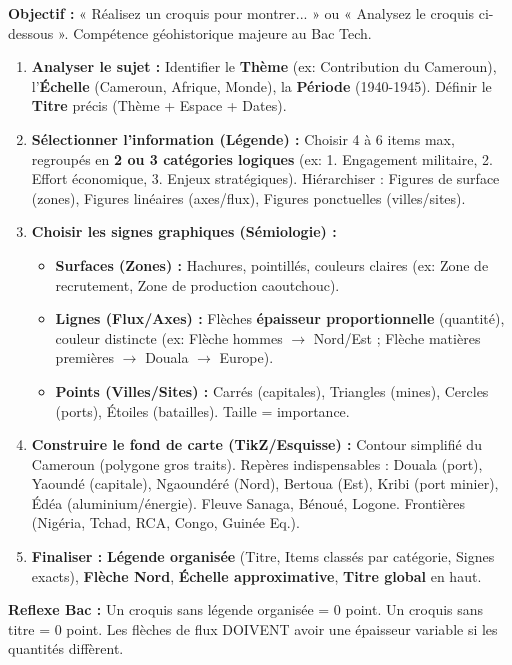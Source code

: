 \documentclass[11pt]{article}
\newcommand{\cle}[1]{{\popxbold\color{popdark}#1}}
\begin{document}
\begin{methode}
\textbf{Objectif :} « Réalisez un croquis pour montrer... » ou « Analysez le croquis ci-dessous ». Compétence géohistorique majeure au Bac Tech.
\begin{enumerate}
    \item \textbf{Analyser le sujet :} Identifier le \textbf{Thème} (ex: Contribution du Cameroun), l'\textbf{Échelle} (Cameroun, Afrique, Monde), la \textbf{Période} (1940-1945). Définir le \textbf{Titre} précis (Thème + Espace + Dates).
    \item \textbf{Sélectionner l'information (Légende) :} Choisir 4 à 6 items max, regroupés en \textbf{2 ou 3 catégories logiques} (ex: 1. Engagement militaire, 2. Effort économique, 3. Enjeux stratégiques). Hiérarchiser : Figures de surface (zones), Figures linéaires (axes/flux), Figures ponctuelles (villes/sites).
    \item \textbf{Choisir les signes graphiques (Sémiologie) :}
    \begin{itemize}
        \item \textbf{Surfaces (Zones) :} Hachures, pointillés, couleurs claires (ex: Zone de recrutement, Zone de production caoutchouc).
        \item \textbf{Lignes (Flux/Axes) :} Flèches \textbf{épaisseur proportionnelle} (quantité), couleur distincte (ex: Flèche hommes $\rightarrow$ Nord/Est ; Flèche matières premières $\rightarrow$ Douala $\rightarrow$ Europe).
        \item \textbf{Points (Villes/Sites) :} Carrés (capitales), Triangles (mines), Cercles (ports), Étoiles (batailles). Taille = importance.
    \end{itemize}
    \item \textbf{Construire le fond de carte (TikZ/Esquisse) :} Contour simplifié du Cameroun (polygone gros traits). Repères indispensables : \cle{Douala} (port), \cle{Yaoundé} (capitale), \cle{Ngaoundéré} (Nord), \cle{Bertoua} (Est), \cle{Kribi} (port minier), \cle{Édéa} (aluminium/énergie). Fleuve \cle{Sanaga}, \cle{Bénoué}, \cle{Logone}. Frontières (Nigéria, Tchad, RCA, Congo, Guinée Eq.).
    \item \textbf{Finaliser :} \textbf{Légende organisée} (Titre, Items classés par catégorie, Signes exacts), \textbf{Flèche Nord}, \textbf{Échelle approximative}, \textbf{Titre global} en haut.
\end{enumerate}
\textbf{Reflexe Bac :} Un croquis sans légende organisée = 0 point. Un croquis sans titre = 0 point. Les flèches de flux DOIVENT avoir une épaisseur variable si les quantités diffèrent.
\end{methode}
\end{document}
